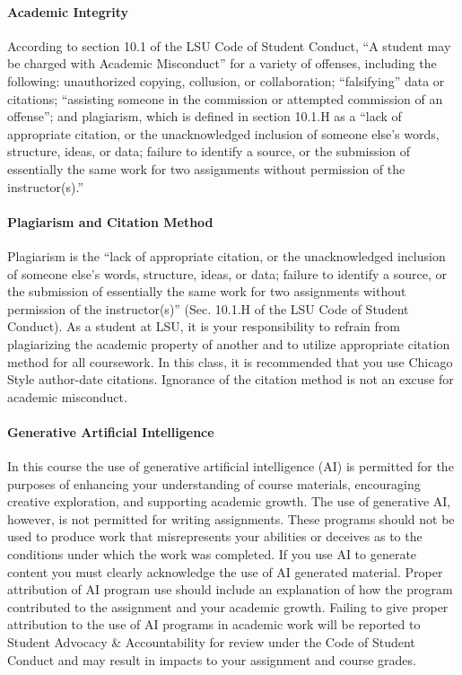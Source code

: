 \documentclass[11pt,article,oneside]{memoir}
\begin{document}
\paragraph{Academic Integrity}
According to section 10.1 
of the LSU Code of Student Conduct, 
``A student may be charged with Academic Misconduct'' 
for a variety of offenses, including the following: 
unauthorized copying, collusion, or collaboration; 
``falsifying'' data or citations; 
``assisting someone in the commission 
or attempted commission of an offense''; 
and plagiarism, which is defined in section 10.1.H as a 
``lack of appropriate citation, 
or the unacknowledged inclusion 
of someone else's words, structure, ideas, or data; 
failure to identify a source, 
or the submission of essentially the same work 
for two assignments 
without permission of the instructor(s).''

\paragraph{Plagiarism and Citation Method}
Plagiarism is the 
``lack of appropriate citation, or the unacknowledged inclusion 
of someone else's words, structure, ideas, or data; 
failure to identify a source, 
or the submission of essentially the same work 
for two assignments without permission of the instructor(s)'' 
(Sec. 10.1.H of the LSU Code of Student Conduct). 
As a student at LSU, 
it is your responsibility to refrain from 
plagiarizing the academic property of another 
and to utilize appropriate citation method for all coursework. 
In this class, it is recommended that you use 
Chicago Style author-date citations. 
Ignorance of the citation method
 is not an excuse for academic misconduct.

\paragraph{Generative Artificial Intelligence}
In this course the use of generative artificial intelligence (AI) 
is permitted for the purposes of enhancing your understanding 
of course materials, encouraging creative exploration, 
and supporting academic growth. 
The use of generative AI, however, 
is not permitted for writing assignments. 
These programs should not be used to produce work 
that misrepresents your abilities 
or deceives as to the conditions 
under which the work was completed. 
If you use AI to generate content 
you must clearly acknowledge the use of AI generated material. 
Proper attribution of AI program use
should include an explanation of how the program 
contributed to the assignment and your academic growth. 
Failing to give proper attribution 
to the use of AI programs in academic work
 will be reported to Student Advocacy \& Accountability 
 for review under the Code of Student Conduct 
 and may result in impacts to your assignment and course grades.
\end{document}

